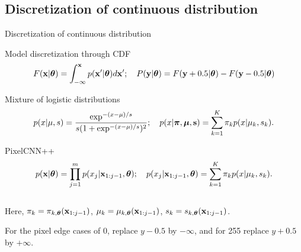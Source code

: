 \subsection{Discretization of continuous distribution}
\begin{frame}{Discretization of continuous distribution}
	\vspace{-0.3cm}
	\begin{block}{Model discretization through CDF}
		\vspace{-0.6cm}
		\[
			F(\mathbf{x} | \boldsymbol{\theta}) = \int_{-\infty}^{\mathbf{x}} p(\mathbf{x}' | \boldsymbol{\theta}) d\mathbf{x}'; \quad 
			P(\mathbf{y} | \boldsymbol{\theta}) = F(\mathbf{y} + 0.5 | \boldsymbol{\theta}) - F(\mathbf{y} - 0.5 | \boldsymbol{\theta})
		\]
	\end{block}
	\vspace{-0.6cm}
	\begin{block}{Mixture of logistic distributions}
		\vspace{-0.7cm}
		\[
			p(x | \mu, s) = \frac{\exp^{-(x - \mu) / s}}{s (1 + \exp^{-(x - \mu) / s})^2}; \quad p(x | \boldsymbol{\pi}, \boldsymbol{\mu}, \mathbf{s}) = \sum_{k=1}^K \pi_k p(x | \mu_k, s_k).
		\]
		\vspace{-0.7cm}
	\end{block}
	\begin{block}{PixelCNN++}
		\vspace{-0.7cm}
		\[
			p(\mathbf{x} | \boldsymbol{\theta}) = \prod_{j=1}^m p(x_j | \mathbf{x}_{1:j-1}, \boldsymbol{\theta}); \quad p(x_j | \mathbf{x}_{1:j-1}, \boldsymbol{\theta}) = \sum_{k=1}^K \pi_k p(x | \mu_k, s_k).
		\]
		\vspace{-0.5cm} \\
		Here, $\pi_k = \pi_{k, \boldsymbol{\theta}}(\mathbf{x}_{1:j-1})$, $\mu_k = \mu_{k, \boldsymbol{\theta}}(\mathbf{x}_{1:j-1})$, $s_k = s_{k, \boldsymbol{\theta}}(\mathbf{x}_{1:j-1})$.
	\end{block}

	For the pixel edge cases of 0, replace $y - 0.5$ by $-\infty$, and for 255 replace $y + 0.5$ by $+\infty$.
	\end{frame}
